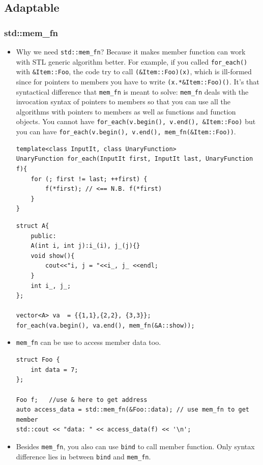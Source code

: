 \documentclass[a4paper,11pt,twoside]{book}
\begin{document}
\subsection{Adaptable}


\subsubsection{std::mem\_fn }
\begin{itemize}
	\item Why we need \texttt{std::mem\_fn}? Because it makes member function can work with STL generic algorithm better. For example, if you called \texttt{for\_each()} with \texttt{\&Item::Foo}, the code try to call \texttt{(\&Item::Foo)(x)}, which is ill-formed since for pointers to members you have to write \texttt{(x.*\&Item::Foo)()}. It's that syntactical difference that \texttt{mem\_fn} is meant to solve: \texttt{mem\_fn} deals with the invocation syntax of pointers to members so that you can use all the algorithms with pointers to members as well as functions and function objects. You cannot have \texttt{for\_each(v.begin(), v.end(), \&Item::Foo)} but you can have \texttt{for\_each(v.begin(), v.end(), mem\_fn(\&Item::Foo))}.
\begin{lstlisting}
template<class InputIt, class UnaryFunction>
UnaryFunction for_each(InputIt first, InputIt last, UnaryFunction f){
	for (; first != last; ++first) {
		f(*first); // <== N.B. f(*first)
	}
}
\end{lstlisting}

\begin{lstlisting}
struct A{
	public:
	A(int i, int j):i_(i), j_(j){}
	void show(){
		cout<<"i, j = "<<i_, j_ <<endl;
	}
	int i_, j_;
};

vector<A> va  = {{1,1},{2,2}, {3,3}};
for_each(va.begin(), va.end(), mem_fn(&A::show));
\end{lstlisting}

	\item \texttt{mem\_fn} can be use to access member data too.
\begin{lstlisting}
struct Foo {
	int data = 7;
};

Foo f;   //use & here to get address
auto access_data = std::mem_fn(&Foo::data); // use mem_fn to get member
std::cout << "data: " << access_data(f) << '\n';
\end{lstlisting}


	\item Besides \texttt{mem\_fn}, you also can use \texttt{bind} to call member function. Only syntax difference lies in between \texttt{bind} and \texttt{mem\_fn}.


\end{itemize}
\end{document}
